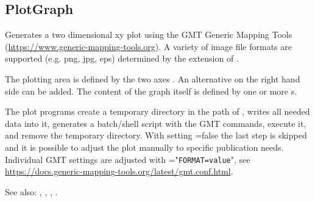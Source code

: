 \clearpage
\subsection{PlotGraph}\label{PlotGraph}
Generates a two dimensional xy plot using the GMT Generic Mapping Tools (\url{https://www.generic-mapping-tools.org}).
A variety of image file formats are supported (e.g. png, jpg, eps) determined by the extension of .

The plotting area is defined by the two axes . An alternative 
on the right hand side can be added. The content of the graph itself is defined
by one or more s.

The plot programs create a temporary directory in the path of , writes all needed data into it,
generates a batch/shell script with the GMT commands, execute it, and remove the temporary directory.
With setting =false the last step is skipped and it is possible to adjust the plot manually
to specific publication needs. Individual GMT settings are adjusted with ="\verb|FORMAT=value|",
see \url{https://docs.generic-mapping-tools.org/latest/gmt.conf.html}.

See also: , , , .


